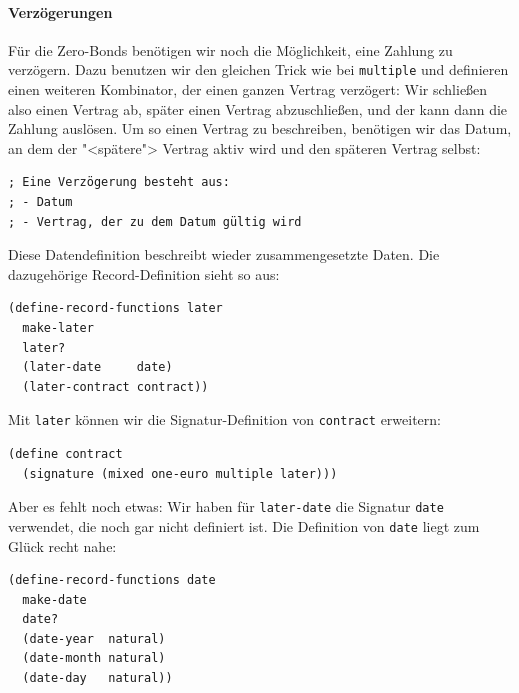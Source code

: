 \paragraph{Verzögerungen}
Für die Zero-Bonds benötigen wir noch die Möglichkeit,
eine Zahlung zu verzögern.
Dazu benutzen wir den gleichen Trick wie
bei \lstinline{multiple} und definieren einen weiteren Kombinator, der
einen ganzen Vertrag verzögert: Wir schließen also einen Vertrag ab,
später einen Vertrag abzuschließen, und der kann dann die Zahlung
auslösen.  Um so einen Vertrag zu beschreiben, benötigen wir das
Datum, an dem der "<spätere"> Vertrag aktiv wird und den späteren
Vertrag selbst:
%
\begin{lstlisting}
; Eine Verzögerung besteht aus:
; - Datum
; - Vertrag, der zu dem Datum gültig wird
\end{lstlisting}
%
Diese Datendefinition beschreibt wieder zusammengesetzte Daten.  Die
dazugehörige Record-Definition sieht so aus:
%
\begin{lstlisting}
(define-record-functions later
  make-later
  later?
  (later-date     date)
  (later-contract contract))
\end{lstlisting}
%
Mit \lstinline{later} können wir die Signatur-Definition von
\lstinline{contract} erweitern:
%
\begin{lstlisting}
(define contract
  (signature (mixed one-euro multiple later)))
\end{lstlisting}
%
Aber es fehlt noch etwas: Wir haben für \lstinline{later-date} die
Signatur \lstinline{date} verwendet, die noch gar nicht definiert ist.
Die Definition von \texttt{date} liegt zum Glück recht nahe:
%
\begin{lstlisting}
(define-record-functions date
  make-date
  date?
  (date-year  natural)
  (date-month natural)
  (date-day   natural))
\end{lstlisting}
%
